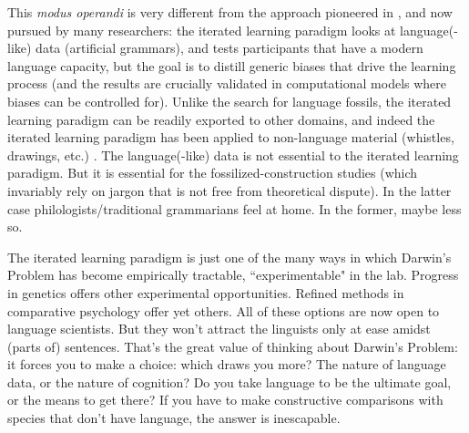 This \textit{modus operandi} is very different from the approach pioneered in \cite{kirby2001spontaneous}, and now pursued by many researchers: the iterated learning paradigm looks at language(-like) data (artificial grammars), and tests participants that have a modern language capacity, but the goal is to distill generic biases that drive the learning process (and the results are crucially validated in computational models where biases can be controlled for). Unlike the search for language fossils, the iterated learning paradigm can be readily exported to other domains, and indeed the iterated learning paradigm has been applied to non-language material (whistles, drawings, etc.) \citep{cornish2013systems,verhoef2013combinatorial}. The language(-like) data is not essential to the iterated learning paradigm. But it is essential for the fossilized-construction studies (which invariably rely on jargon that is not free from theoretical dispute). In the latter case philologists/traditional grammarians feel at home. In the former, maybe less so.

The iterated learning paradigm is just one of the many ways in which Darwin's Problem has become empirically tractable, ``experimentable" in the lab. Progress in genetics offers other experimental opportunities. Refined methods in comparative psychology offer yet others. All of these options are now open to language scientists. But they won't attract the linguists only at ease amidst (parts of) sentences. That's the great value of thinking about Darwin's Problem: it forces you to make a choice: which draws you more? The nature of language data, or the nature of cognition? Do you take language to be the ultimate goal, or the means to get there? If you have to make constructive comparisons with species that don't have language, the answer is inescapable.

